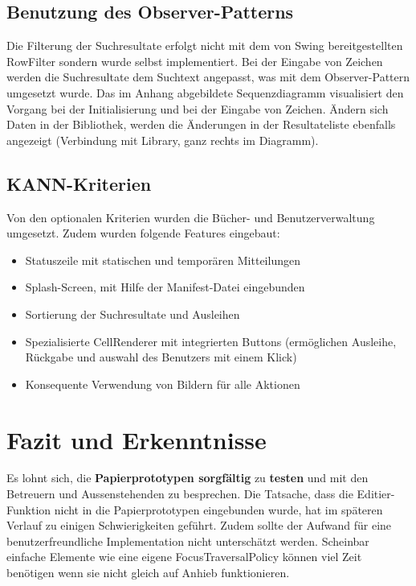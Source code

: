 \documentclass[10pt, a4paper]{scrartcl}
\begin{document}
\subsection{Benutzung des Observer-Patterns}
Die Filterung der Suchresultate erfolgt nicht mit dem von Swing bereitgestellten RowFilter sondern wurde selbst implementiert. Bei der Eingabe von Zeichen werden die Suchresultate dem Suchtext angepasst, was mit dem Observer-Pattern umgesetzt wurde. Das im Anhang abgebildete Sequenzdiagramm visualisiert den Vorgang bei der Initialisierung und bei der Eingabe von Zeichen. Ändern sich Daten in der Bibliothek, werden die Änderungen in der Resultateliste ebenfalls angezeigt (Verbindung mit Library, ganz rechts im Diagramm).

\subsection{KANN-Kriterien}
Von den optionalen Kriterien wurden die Bücher- und Benutzerverwaltung umgesetzt. Zudem wurden folgende Features eingebaut:
\begin{itemize}
	\item Statuszeile mit statischen und temporären Mitteilungen
	\item Splash-Screen, mit Hilfe der Manifest-Datei eingebunden
	\item Sortierung der Suchresultate und Ausleihen
	\item Spezialisierte CellRenderer mit integrierten Buttons (ermöglichen Ausleihe, Rückgabe und auswahl des Benutzers mit einem Klick)
	\item Konsequente Verwendung von Bildern für alle Aktionen
\end{itemize}

\section{Fazit und Erkenntnisse}
Es lohnt sich, die \textbf{Papierprototypen sorgfältig} zu \textbf{testen} und mit den Betreuern und Aussenstehenden zu besprechen. Die Tatsache, dass die Editier-Funktion nicht in die Papierprototypen eingebunden wurde, hat im späteren Verlauf zu einigen Schwierigkeiten geführt. Zudem sollte der Aufwand für eine benutzerfreundliche Implementation nicht unterschätzt werden. Scheinbar einfache Elemente wie eine eigene FocusTraversalPolicy können viel Zeit benötigen wenn sie nicht gleich auf Anhieb funktionieren.
\end{document}
